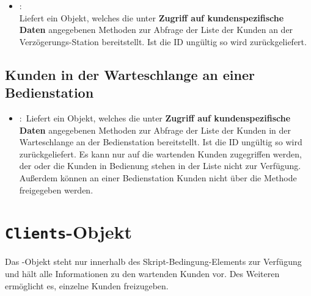 \begin{itemize}

\item
{}:\\
Liefert ein Objekt, welches die unter \textbf{Zugriff auf kundenspezifische Daten} angegebenen Methoden
zur Abfrage der Liste der Kunden an der Verzögerungs-Station  bereitstellt. Ist die ID ungültig
so wird  zurückgeliefert.

\end{itemize}

\section{Kunden in der Warteschlange an einer Bedienstation}

\begin{itemize}

  \item
  :\
  Liefert ein Objekt, welches die unter \textbf{Zugriff auf kundenspezifische Daten} angegebenen Methoden
  zur Abfrage der Liste der Kunden in der Warteschlange an der Bedienstation \cm{id} bereitstellt. Ist die ID ungültig
  so wird \cm{null} zurückgeliefert. Es kann nur auf die wartenden Kunden zugegriffen werden, der oder die Kunden
  in Bedienung stehen in der Liste nicht zur Verfügung.
  Außerdem können an einer Bedienstation Kunden nicht über die  Methode freigegeben werden.
  
\end{itemize}



\chapter{\texttt{Clients}-Objekt}

Das -Objekt steht nur innerhalb des Skript-Bedingung-Elements zur Verfügung
und hält alle Informationen zu den wartenden Kunden vor. Des Weiteren ermöglicht es,
einzelne Kunden freizugeben.

